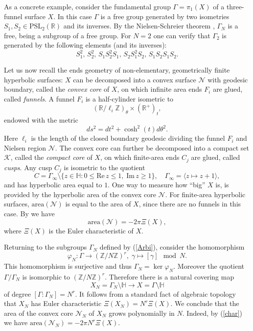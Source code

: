 \documentclass[12pt]{article}
\newcommand{\RR}{\mathbb{R}}
\newcommand{\ZZ}{\mathbb{Z}}
\newcommand{\PSL}{\mathrm{PSL}}
\newcommand{\R}{\mathrm{Re}\,}
\newcommand{\I}{\mathrm{Im}\,}
\newcommand{\HH}{\mathbb{H}}
\begin{document}
As a concrete example, consider the fundamental group $ \Gamma = \pi_{1}(X) $ of a three-funnel surface $ X $. In this case $ \Gamma $ is a free group generated by two isometries $ S_{1}, S_{2} \in \PSL_{2}(\RR) $ and its inverses. By the Nielsen-Schreier theorem \cite{Stillwell}, $ \Gamma_{N} $ is a free, being a subgroup of a free group. For $ N=2 $ one can verify that $ \Gamma_{2} $ is generated by the following elements (and its inverses):
$$ S_{1}^{2},\, S_{2}^{2},\, S_{1}S_{2}^{2}S_{1},\, S_{2}S_{1}^{2}S_{2},\, S_{1}S_{2}S_{1}S_{2}. $$

Let us now recall the ends geometry of non-elementary, geometrically finite hyperbolic surfaces: $ X $ can be decomposed into a convex surface $ \mathcal{N} $ with geodesic boundary, called the \textit{convex core} of $ X $, on which infinite area ends $ F_{i} $ are glued, called \textit{funnels}. A funnel $ F_{i} $ is a half-cylinder isometric to
$$ \left( \RR/\ell_{i}\ZZ\right)_{\theta}\times (\RR^{+})_{t}, $$
endowed with the metric 
$$ ds^{2} = dt^{2} + \cosh^{2}(t) d\theta^{2}. $$
Here $ \ell_{i} $ is the length of the closed boundary geodesic dividing the funnel $ F_{i} $ and Nielsen region $ \mathcal{N} $. The convex core can further be decomposed into a compact set $ \mathcal{K} $, called the \textit{compact core} of $ X $, on which finite-area ends $ C_{j} $ are glued, called \textit{cusps}. Any  cusp $ C_{j} $ is isometric to the quotient
$$ C = \Gamma_{\infty}\setminus \{ z\in \HH : 0\leq \R z \leq 1, \; \I z \geq 1 \}, \quad \Gamma_{\infty} = \langle z\mapsto z+1\rangle, $$ 
and has hyperbolic area equal to $ 1 $. One way to measure how ``big'' $ X $ is, is provided by the hyperbolic area of the convex core $ \mathcal{N} $. For finite-area hyperbolic surfaces, $ \mathrm{area}(\mathcal{N}) $ is equal to the area of $ X $, since there are no funnels in this case. By \cite[Lemma~10.3]{Borthwick} we have 
\begin{equation}\label{char}
\mathrm{area}(\mathcal{N}) = -2\pi \Xi(X),
\end{equation}
where $ \Xi(X) $ is the Euler characteristic of $ X $. 

Returning to the subgroups $ \Gamma_{N} $ defined by (\ref{Arbi}), consider the homomorphism 
$$ \varphi_{N} : \Gamma \to \left(\ZZ/N\ZZ\right)^{r}, \; \gamma \mapsto [\gamma] \mod N. $$ This homomorphism is surjective and thus $ \Gamma_{N} = \ker \varphi_{N} $. Moreover the quotient $ \Gamma/\Gamma_{N} $ is isomorphic to $ \left(\ZZ/N\ZZ\right)^{r} $. Therefore there is a natural covering map
$$ X_{N} = \Gamma_{N}\setminus\HH \to X = \Gamma\setminus\HH  $$
of degree $ [\Gamma : \Gamma_{N}] = N^{r} $. It follows from a standard fact of algebraic topology that $ X_{N} $ has Euler characteristic $ \Xi(X_{N}) = N^{r}\Xi(X) $. We conclude that the area of the convex core $ \mathcal{N}_{N} $ of $ X_{N} $ grows polynomially in $ N $. Indeed, by (\ref{char}) we have $ \mathrm{area}(\mathcal{N}_{N}) = -2\pi N^{r} \Xi(X). $
\end{document}
